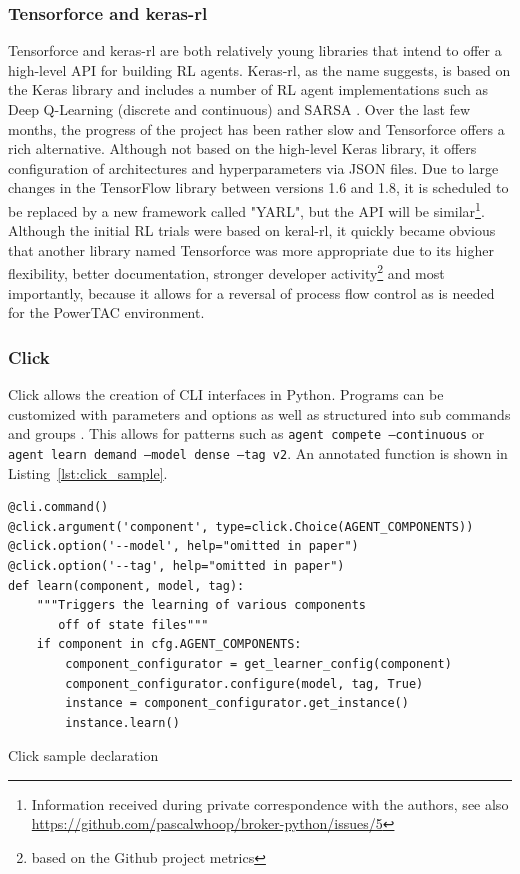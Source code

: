 \subsubsection{Tensorforce and keras-rl}%
\label{sub:tensorforce_and_keras_rl}

Tensorforce and keras-rl are both relatively young libraries that intend to offer a high-level \ac{API} for building
\ac{RL} agents. Keras-rl, as the name suggests, is based on the Keras library and includes a number of \ac{RL} agent
implementations such as Deep Q-Learning (discrete and continuous) and \ac{SARSA} \cite[]{plappert2016kerasrl}. Over the
last few months, the progress of the project has been rather slow and Tensorforce offers a rich alternative.
Although not based on the high-level Keras library, it offers configuration of architectures and hyperparameters via
\ac{JSON} files. Due to large changes in the TensorFlow library between versions 1.6 and 1.8, it is scheduled to be
replaced by a new framework called "YARL", but the \ac{API} will be similar\footnote{Information received during private
    correspondence with the authors, see also
\url{https://github.com/pascalwhoop/broker-python/issues/5}}. Although the initial \ac{RL} trials were based on
keral-rl, it quickly became obvious that another library named Tensorforce was more appropriate due to its higher
flexibility, better documentation, stronger developer activity\footnote{based on the Github project metrics} and most
importantly, because it allows for a reversal of process flow control as is needed for the
\ac{PowerTAC} environment.

\subsubsection{Click}%
\label{sub:click}

Click allows the creation of CLI interfaces in Python. Programs can be customized with parameters and options as well
as structured into sub commands and groups \citep{clickcli}. This allows for patterns such as \texttt{agent compete
--continuous} or \texttt{agent learn demand --model dense --tag v2}. An annotated function is shown in
Listing~\ref{lst:click_sample}.

\begin{listing}[h]
    \begin{verbatim}
@cli.command()
@click.argument('component', type=click.Choice(AGENT_COMPONENTS))
@click.option('--model', help="omitted in paper")
@click.option('--tag', help="omitted in paper")
def learn(component, model, tag):
    """Triggers the learning of various components
       off of state files"""
    if component in cfg.AGENT_COMPONENTS:
        component_configurator = get_learner_config(component)
        component_configurator.configure(model, tag, True)
        instance = component_configurator.get_instance()
        instance.learn()
    \end{verbatim}
    \caption{Click sample declaration}
    \label{lst:click_sample}
\end{listing}

